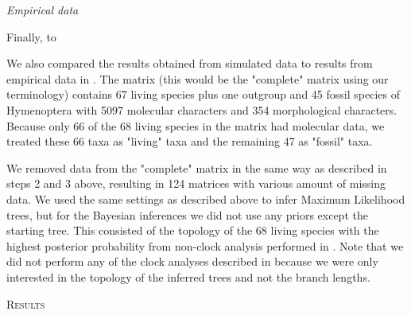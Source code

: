 \documentclass[12pt,letterpaper]{article}
\renewcommand{\section}[1]{%
\bigskip
\begin{center}
\begin{Large}
\normalfont\scshape #1
\medskip
\end{Large}
\end{center}}
\renewcommand{\subsection}[1]{%
\bigskip
\begin{center}
\begin{large}
\normalfont\itshape #1
\end{large}
\end{center}}
\begin{document}

\subsection{Empirical data} %
Finally, to %

We also compared the results obtained from simulated data to results from empirical data in \citet{ronquista2012}.
The matrix (this would be the "complete" matrix using our terminology) contains 67 living species plus one outgroup and 45 fossil species of Hymenoptera with 5097 molecular characters and 354 morphological characters.
Because only 66 of the 68 living species in the matrix had molecular data, we treated these 66 taxa as "living" taxa and the remaining 47 as "fossil" taxa. 

We removed data from the "complete" matrix in the same way as described in steps 2 and 3 above, resulting in 124 matrices with various amount of missing data.
We used the same settings as described above to infer Maximum Likelihood trees, but for the Bayesian inferences we did not use any priors except the starting tree.
This consisted of the topology of the 68 living species with the highest posterior probability from non-clock analysis performed in \citet{ronquista2012}.
Note that we did not perform any of the clock analyses described in \citet{ronquista2012} because we were only interested in the topology of the inferred trees and not the branch lengths.



%
%


\section{Results}

\end{document}
